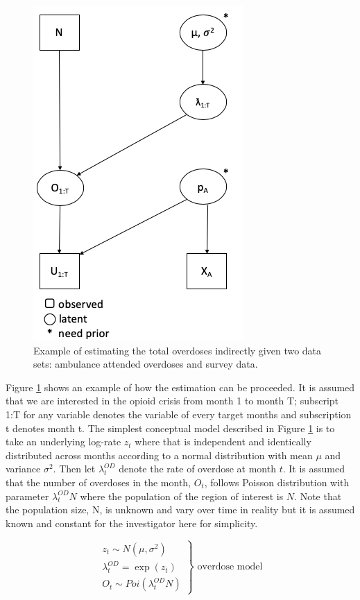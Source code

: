 \documentclass[12pt]{article}
\begin{document}
\begin{figure}[htb]
	\centering
	\includegraphics[width=0.5\linewidth]{Figures/simple_drawing}
	\caption{Example of estimating the total overdoses indirectly given two data sets: ambulance attended overdoses and survey data.}
	\label{simple_draw}
\end{figure}

Figure \ref{simple_draw} shows an example of how the estimation can be proceeded. It is assumed that we are interested in the opioid crisis from month 1 to month T; subscript 1:T for any variable denotes the variable of every target months and subscription t denotes month t. The simplest conceptual model described in Figure \ref{simple_draw} is to take an underlying log-rate $z_t$ where that is independent and identically distributed across months according to a normal distribution with mean $\mu$ and variance $\sigma^2$. \cite{Irvine:modelling} Then let $\lambda_{t}^{OD}$ denote the rate of overdose at month $t$. It is assumed that the number of overdoses in the month, $O_t$, follows Poisson distribution with parameter $\lambda_{t}^{OD}N$ where the population of the region of interest is $N$. Note that the population size, N, is unknown and vary over time in reality but it is assumed known and constant for the investigator here for simplicity. 
 
 \begin{equation}
 \label{overdose}
 \left.\begin{aligned}
 z_{t} \sim N(\mu, \sigma^{2}) \\
 \lambda_{t}^{OD} = \exp(z_{t})\\
 O_{t} \sim Poi(\lambda_{t}^{OD}N) 
 \end{aligned}\right\} 
 \text{		overdose model} 
 \end{equation}
 
\end{document}
